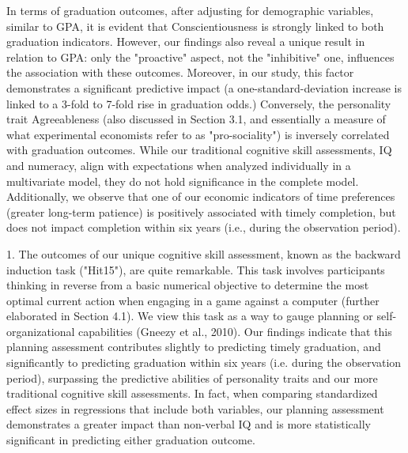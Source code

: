 \documentclass[12pt,a4paper]{article}
\begin{document}
In terms of graduation outcomes, after adjusting for demographic variables, similar to GPA, it is evident that Conscientiousness is strongly linked to both graduation indicators. However, our findings also reveal a unique result in relation to GPA: only the "proactive" aspect, not the "inhibitive" one, influences the association with these outcomes. Moreover, in our study, this factor demonstrates a significant predictive impact (a one-standard-deviation increase is linked to a 3-fold to 7-fold rise in graduation odds.) Conversely, the personality trait Agreeableness (also discussed in Section 3.1, and essentially a measure of what experimental economists refer to as "pro-sociality") is inversely correlated with graduation outcomes. While our traditional cognitive skill assessments, IQ and numeracy, align with expectations when analyzed individually in a multivariate model, they do not hold significance in the complete model. Additionally, we observe that one of our economic indicators of time preferences (greater long-term patience) is positively associated with timely completion, but does not impact completion within six years (i.e., during the observation period).

1. The outcomes of our unique cognitive skill assessment, known as the backward induction task ("Hit15"), are quite remarkable. This task involves participants thinking in reverse from a basic numerical objective to determine the most optimal current action when engaging in a game against a computer (further elaborated in Section 4.1). We view this task as a way to gauge planning or self-organizational capabilities (Gneezy et al., 2010). Our findings indicate that this planning assessment contributes slightly to predicting timely graduation, and significantly to predicting graduation within six years (i.e. during the observation period), surpassing the predictive abilities of personality traits and our more traditional cognitive skill assessments. In fact, when comparing standardized effect sizes in regressions that include both variables, our planning assessment demonstrates a greater impact than non-verbal IQ and is more statistically significant in predicting either graduation outcome.
\end{document}
